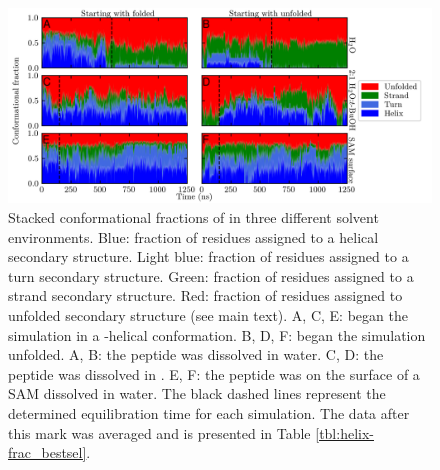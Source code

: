 \begin{figure}
    \center
    \includegraphics[width=6.0in]{figures-helix/combined_helicity.png}
    \caption{
        Stacked conformational fractions of \pep{} in three different solvent environments. 
        Blue: fraction of residues assigned to a helical secondary structure. 
        Light blue: fraction of residues assigned to a turn secondary structure. 
        Green: fraction of residues assigned to a strand secondary structure. 
        Red: fraction of residues assigned to unfolded secondary structure (see main text). 
        A, C, E: \pep{} began the simulation in a \textalpha{}-helical conformation. 
        B, D, F: \pep{} began the simulation unfolded. 
        A, B: the peptide was dissolved in water. 
        C, D: the peptide was dissolved in \tbawat{}. 
        E, F: the peptide was on the surface of a SAM dissolved in water. 
        The black dashed lines represent the determined equilibration time for each simulation. 
        The data after this mark was averaged and is presented in Table \ref{tbl:helix-frac_bestsel}.
    }
    \label{fig:helix-conf_fracs}
\end{figure}

